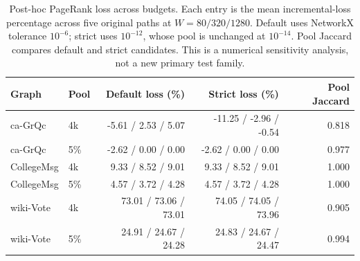 \begin{table}[htbp]
\caption{Post-hoc PageRank loss across budgets. Each entry is the mean incremental-loss percentage across five original paths at $W=80/320/1280$. Default uses NetworkX tolerance $10^{-6}$; strict uses $10^{-12}$, whose pool is unchanged at $10^{-14}$. Pool Jaccard compares default and strict candidates. This is a numerical sensitivity analysis, not a new primary test family.}\label{tab:precision-budget}
\begin{tabular}{llrrr}
\toprule
Graph & Pool & Default loss (\%) & Strict loss (\%) & Pool Jaccard \\
\midrule
ca-GrQc & 4k & -5.61 / 2.53 / 5.07 & -11.25 / -2.96 / -0.54 & 0.818 \\
ca-GrQc & 5\% & -2.62 / 0.00 / 0.00 & -2.62 / 0.00 / 0.00 & 0.977 \\
CollegeMsg & 4k & 9.33 / 8.52 / 9.01 & 9.33 / 8.52 / 9.01 & 1.000 \\
CollegeMsg & 5\% & 4.57 / 3.72 / 4.28 & 4.57 / 3.72 / 4.28 & 1.000 \\
wiki-Vote & 4k & 73.01 / 73.06 / 73.01 & 74.05 / 74.05 / 73.96 & 0.905 \\
wiki-Vote & 5\% & 24.91 / 24.67 / 24.28 & 24.83 / 24.67 / 24.47 & 0.994 \\
\bottomrule
\end{tabular}
\end{table}
